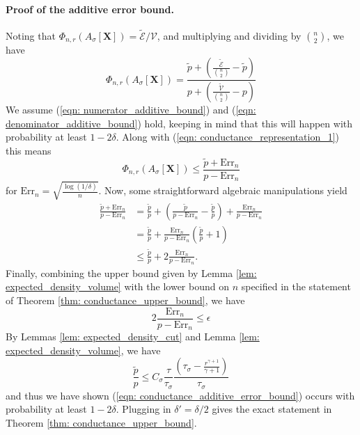 \documentclass{article}
\newcommand{\Asig}{A_{\sigma}}
\newcommand{\1}{\mathbf{1}}
\newcommand{\Err}{\mathrm{Err}}
\theoremstyle{aldenthm}
\begin{document}
\paragraph{Proof of the additive error bound.}
Noting that $\Phi_{n,r}(\Asig[\mathbf{X}]) = \mathcal{\widetilde{E}} / \mathcal{V}$, and multiplying and dividing by ${n \choose 2}$, we have
\begin{equation}
\label{eqn: conductance_representation_1}
\Phi_{n,r}(\Asig[\mathbf{X}]) = \frac{\widetilde{p} + \left(\frac{\widetilde{\mathcal{E}}}{{n \choose 2}} - \widetilde{p}\right)}{p + \left(\frac{\widetilde{\mathcal{V}}}{{n \choose 2}} - p \right)}
\end{equation}
We assume (\ref{eqn: numerator_additive_bound}) and (\ref{eqn: denominator_additive_bound}) hold, keeping in mind that this will happen with probability at least $1 - 2\delta$. Along with (\ref{eqn: conductance_representation_1}) this means
\begin{equation*}
\Phi_{n,r}(\Asig[\mathbf{X}]) \leq \frac{\widetilde{p} + \Err_n}{p - \Err_n}
\end{equation*}
for $\Err_n = \sqrt{\frac{\log(1/\delta)}{n}}$.
Now, some straightforward algebraic manipulations yield
\begin{align*}
\frac{\widetilde{p} + \Err_n}{p - \Err_n} & = \frac{\widetilde{p}}{p} + \left(\frac{\widetilde{p}}{p - \Err_n} - \frac{\widetilde{p}}{p}\right) + \frac{\Err_n}{p - \Err_n} \\
& = \frac{\widetilde{p}}{p} + \frac{\Err_n}{p - \Err_n}\left(\frac{\widetilde{p}}{p} + 1\right) \\
& \leq \frac{\widetilde{p}}{p} + 2 \frac{\Err_n}{p - \Err_n}.
\end{align*}
Finally, combining the upper bound given by Lemma \ref{lem: expected_density_volume} with the lower bound on $n$ specified in the statement of Theorem \ref{thm: conductance_upper_bound}, we have
\begin{equation*}
2 \frac{\Err_n}{p - \Err_n} \leq \epsilon
\end{equation*}
By Lemmas \ref{lem: expected_density_cut} and Lemma \ref{lem: expected_density_volume}, we have
\begin{equation*}
\frac{\widetilde{p}}{p} \leq C_{\sigma} \frac{\tau}{\tau_{\sigma}} \frac{(\tau_{\sigma} - \frac{r^{\gamma+1}}{\gamma+1})}{\tau_{\sigma}}
\end{equation*}
and thus we have shown (\ref{eqn: conductance_additive_error_bound}) occurs with probability at least $1 - 2\delta$. Plugging in $\delta' = \delta/2$ gives the exact statement in Theorem \ref{thm: conductance_upper_bound}.
\end{document}
